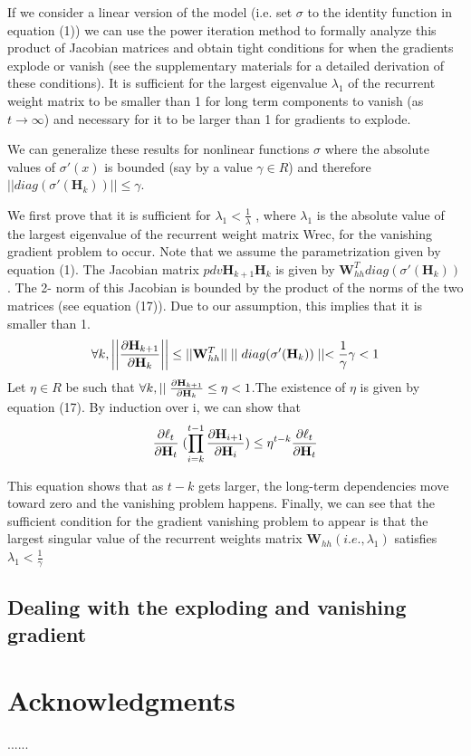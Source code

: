 \documentclass{article}
\begin{document}
If we consider a linear version of the model (i.e. set $\sigma$ to
the identity function in equation (1)) we can use the
power iteration method to formally analyze this product 
of Jacobian matrices and obtain tight conditions
for when the gradients explode or vanish (see the supplementary materials for a detailed derivation of these
conditions). It is sufficient for the largest eigenvalue
$\lambda_1$ of the recurrent weight matrix to be smaller than
1 for long term components to vanish (as $t \rightarrow \infty$) and
necessary for it to be larger than 1 for gradients to
explode.

We can generalize these results for nonlinear functions
$\sigma$ where the absolute values of $\sigma'(x)$ is bounded (say
by a value $\gamma \in R$) and therefore $||diag(\sigma'(\mathbf{H}_k))|| \le \gamma$.

We first prove that it is sufficient for $\lambda_1 < \frac{1}{\lambda}$ , where
$\lambda_1$ is the absolute value of the largest eigenvalue of
the recurrent weight matrix Wrec, for the vanishing
gradient problem to occur. Note that we assume the
parametrization given by equation (1). The Jacobian
matrix $pdv{\mathbf{H}_{k+1}}{\mathbf{H}_k}$ is given by $\mathbf{W}_{hh}^T diag(\sigma'(\mathbf{H}_k))$. The 2-
norm of this Jacobian is bounded by the product of the norms of the two matrices (see equation (17)). Due
to our assumption, this implies that it is smaller than 1.
\begin{equation}
  \forall k, \bigg |\bigg | \pdv{\mathbf{H}_{k+1}}{\mathbf{H}_k} \bigg |\bigg | \le ||\mathbf{W}_{hh}^T||
  \mid\mid diag(\sigma'(\mathbf{H}_k))\mid\mid < \frac{1}{\gamma}\gamma < 1
\end{equation} 
Let $\eta \in R$ be such that $\forall k, \mid\mid \pdv{\mathbf{H}_{k+1}}{\mathbf{H}_k} \le \eta < 1$.The
existence of $\eta$ is given by equation (17). By induction
over i, we can show that
\begin{equation}
  \pdv{\ell_t}{\mathbf{H}_t} \; (\prod_{i=k}^{t-1} \pdv{\mathbf{H}_{i+1}}{\mathbf{H}_i}) \le \eta^{t-k} \pdv{\ell_t}{\mathbf{H}_t}
\end{equation}

This equation shows that as $t-k$ gets larger, the long-term
dependencies move toward zero and the vanishing problem
happens. Finally, we can see that the sufficient condition for
the gradient vanishing problem to appear is that the largest
singular value of the recurrent weights matrix $\mathbf{W}_{hh} (i.e., \lambda_1)$
satisfies $\lambda_1 < \frac{1}{\gamma}$

\subsection{Dealing with the exploding and
vanishing gradient}

\section*{Acknowledgments}
......
\end{document}
